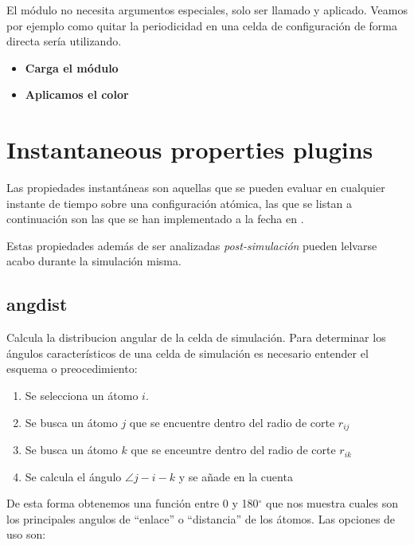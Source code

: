 El m\'odulo no necesita argumentos especiales, solo ser llamado y aplicado.
Veamos por ejemplo como quitar la periodicidad en una celda de configuraci\'on
de forma directa ser\'ia utilizando.

\begin{itemize}
 \item \textbf{Carga el m\'odulo}
 \item \textbf{Aplicamos el color}
\end{itemize}


\section{Instantaneous properties plugins}
Las propiedades instant\'aneas son aquellas que se pueden evaluar en cualquier
instante de tiempo sobre una configuraci\'on at\'omica, las que se listan a
continuaci\'on son las que se han implementado a la fecha en {\lpmd}.

Estas propiedades adem\'as de ser analizadas \textit{post-simulaci\'on} pueden
lelvarse acabo durante la simulaci\'on misma.

\subsection{angdist}
Calcula la distribucion angular de la celda de simulaci\'on. Para determinar los
\'angulos caracter\'isticos de una celda de simulaci\'on es necesario entender
el esquema o preocedimiento:
\begin{enumerate}
 \item Se selecciona un \'atomo $i$.
 \item Se busca un \'atomo $j$ que se encuentre dentro del radio de corte $r_{ij}$
 \item Se busca un \'atomo $k$ que se enceuntre dentro del radio de corte $r_{ik}$
 \item Se calcula el \'angulo  $\angle j-i-k$ y se a\~nade en la cuenta
\end{enumerate}

De esta forma obtenemos una funci\'on entre 0 y 180$^\circ$ que nos muestra
cuales son los principales angulos de ``enlace'' o ``distancia'' de los
\'atomos. Las opciones de uso son:

